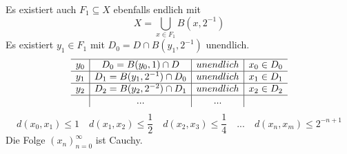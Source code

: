 \documentclass[main.tex]{subfiles}
\begin{document}
\begin{Beweis}[Teil $I$]
\begin{itemize}
      Es existiert auch $F_1 \subseteq X$ ebenfalls endlich mit
      $$X = \bigcup_{x \in F_1} B(x, 2^{-1})$$
      Es existiert $y_1 \in F_1$ mit $D_0 = D \cap B(y_1, 2^{-1})$ unendlich.
      $$\begin{array}{c | c | c | c}
        \hline
        y_0 & D_0 = B(y_0,1) \cap D & unendlich & x_0 \in D_0 \\
        \hline
        y_1 & D_1 = B(y_1,2^{-1}) \cap D_0 & unendlich & x_1 \in D_1 \\
        \hline
        y_2 & D_2 = B(y_2,2^{-2}) \cap D_1 & unendlich & x_2 \in D_2 \\
        \hline
          & ... & ... &
      \end{array}$$
      $$d(x_0,x_1) \leq 1 \quad d(x_1,x_2) \leq \dfrac{1}{2} \quad d(x_2,x_3) \leq \dfrac{1}{4} \quad ... \quad d(x_n,x_m) \leq 2^{-n+1}$$
      Die Folge $(x_n)_{n=0}^\infty$ ist Cauchy.
  \end{itemize}
\end{Beweis}
\end{document}
